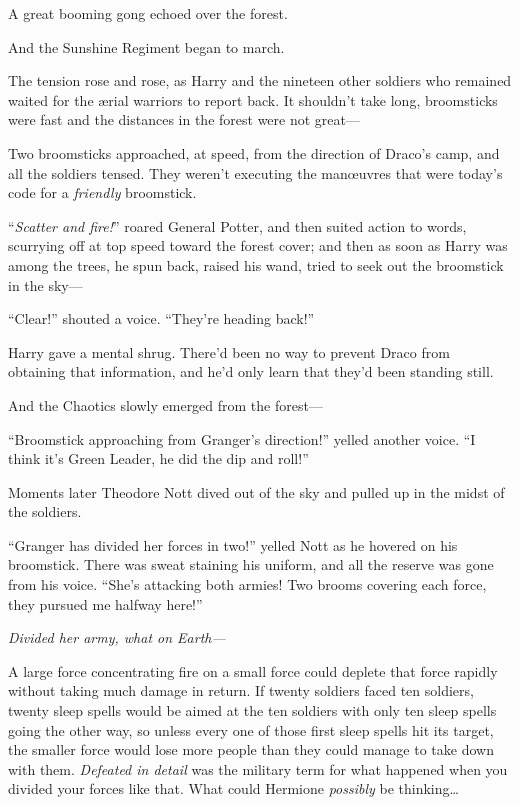 \later

A great booming gong echoed over the forest.

And the Sunshine Regiment began to march.

\later

The tension rose and rose, as Harry and the nineteen other soldiers who remained waited for the ærial warriors to report back. It shouldn’t take long, broomsticks were fast and the distances in the forest were not great—

Two broomsticks approached, at speed, from the direction of Draco’s camp, and all the soldiers tensed. They weren’t executing the manœuvres that were today’s code for a \emph{friendly} broomstick.

“\emph{Scatter and fire!}” roared General Potter, and then suited action to words, scurrying off at top speed toward the forest cover; and then as soon as Harry was among the trees, he spun back, raised his wand, tried to seek out the broomstick in the sky—

“Clear!” shouted a voice. “They’re heading back!”

Harry gave a mental shrug. There’d been no way to prevent Draco from obtaining that information, and he’d only learn that they’d been standing still.

And the Chaotics slowly emerged from the forest—

“Broomstick approaching from Granger’s direction!” yelled another voice. “I think it’s Green Leader, he did the dip and roll!”

Moments later Theodore Nott dived out of the sky and pulled up in the midst of the soldiers.

“Granger has divided her forces in two!” yelled Nott as he hovered on his broomstick. There was sweat staining his uniform, and all the reserve was gone from his voice. “She’s attacking both armies! Two brooms covering each force, they pursued me halfway here!”

\emph{Divided her army, what on Earth—}

A large force concentrating fire on a small force could deplete that force rapidly without taking much damage in return. If twenty soldiers faced ten soldiers, twenty sleep spells would be aimed at the ten soldiers with only ten sleep spells going the other way, so unless every one of those first sleep spells hit its target, the smaller force would lose more people than they could manage to take down with them. \emph{Defeated in detail} was the military term for what happened when you divided your forces like that. What could Hermione \emph{possibly} be thinking…

